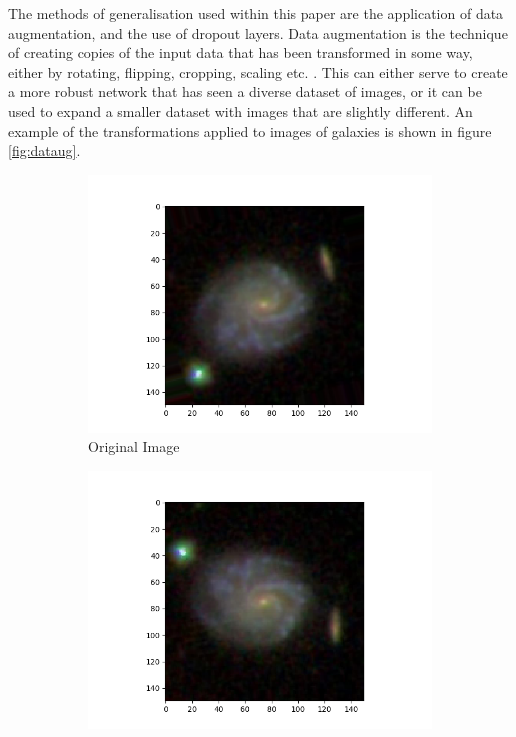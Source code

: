 \documentclass[12pt, onecolumn]{aa}
\begin{document}
The methods of generalisation used within this paper are the application of data augmentation, and the use of dropout layers. Data augmentation is the technique of creating copies of the input data that has been transformed in some way, either by rotating, flipping, cropping, scaling etc. \citep{KhanSalman2018AGtC}. This can either serve to create a more robust network that has seen a diverse dataset of images, or it can be used to expand a smaller dataset with images that are slightly different. An example of the transformations applied to images of galaxies is shown in figure \ref{fig:dataug}.
\begin{figure}[h] 

  \begin{subfigure}[b]{0.5\linewidth}
    \includegraphics[width=\linewidth]{Figures/without_aug.png} 
    \caption{Original Image} \label{fig:dataug1}
  \end{subfigure} 
  \begin{subfigure}[b]{0.5\linewidth}
    \includegraphics[width=\linewidth]{Figures/rot_aug.png} 

\end{subfigure}
\end{figure}
\end{document}
